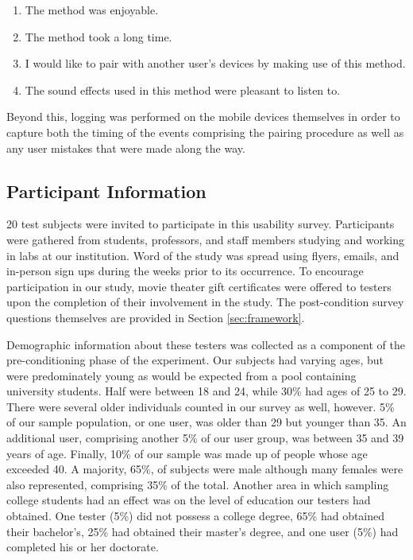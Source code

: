 \begin{enumerate}
\item The method was enjoyable.
\item The method took a long time.
\item I would like to pair with another user's devices by making use of this method.
\item The sound effects used in this method were pleasant to listen to.
\end{enumerate}

Beyond this, logging was performed on the mobile devices themselves in order to capture both the timing of the events comprising the pairing procedure as well as any user mistakes that were made along the way.

\subsection{Participant Information}
\label{sec:participants}


20 test subjects were invited to participate in this usability survey. 
Participants were gathered from students, professors, and staff members
studying and working in labs at our institution. Word of the study was spread
using flyers, emails, and in-person sign ups during the weeks prior to its
occurrence. To encourage participation in our study, movie theater gift
certificates were offered to testers upon the completion of their involvement
in the study. The post-condition survey questions themselves are provided in Section \ref{sec:framework}.



Demographic information about these testers was collected as a component of the pre-conditioning phase of the experiment. Our subjects had varying ages, but were predominately young as would be expected from a pool containing university students. Half were between 18 and 24, while 30\% had ages of 25 to 29. There were several older individuals counted in our survey as well, however. 5\% of our sample population, or one user, was older than 29 but younger than 35. An additional user, comprising another 5\% of our user group, was between 35 and 39 years of age. Finally, 10\% of our sample was made up of people whose age exceeded 40. A majority, 65\%, of subjects were male although many females were also represented, comprising 35\% of the total. Another area in which sampling college students had an effect was on the level of education our testers had obtained. One tester (5\%) did not possess a college degree, 65\% had obtained their bachelor's, 25\% had obtained their master's degree, and one user (5\%) had completed his or her doctorate.

